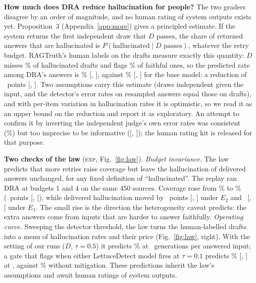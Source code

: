 \textbf{How much does DRA reduce hallucination for people?} The two graders disagree by an order of
magnitude, and no human rating of system outputs exists yet. Proposition~3 (Appendix~\ref{app:more}) gives a
principled estimate. If the system returns the first independent draw that $D$ passes, the share
of returned answers that are hallucinated is $P(\text{hallucinated}\mid D\text{ passes})$, whatever
the retry budget. RAGTruth's human labels on the drafts measure exactly this quantity: $D$ misses
\lawBeta\% of hallucinated drafts and flags \lawAlpha\% of faithful ones, so the predicted rate among
DRA's answers is \lawPi\% [\lawPiLo, \lawPiHi], against \lawH\% [\lawHLo, \lawHHi] for the base model:
a reduction of \lawRed\ points [\lawRedLo, \lawRedHi]. Two assumptions carry this estimate (draws
independent given the input, and the detector's error rates on resampled answers equal those on
drafts), and with per-item variation in hallucination rates it is optimistic, so we read it as an
upper bound on the reduction and report it as exploratory. An attempt to confirm it by inverting the
independent judge's own error rates was consistent (\lawInv\%) but too imprecise to be informative
([\lawInvLo, \lawInvHi]); the human rating kit is released for that purpose.

\textbf{Two checks of the law} (\textsc{exp}, Fig.~\ref{fig:law}). \emph{Budget invariance.} The law
predicts that more retries raise coverage but leave the hallucination of delivered answers unchanged,
for any fixed definition of ``hallucinated''. The replay ran DRA at budgets 1 and 4 on the same 450
sources. Coverage rose from \invCovOne\% to \invCovFour\% (\invCov\ points [\invCovLo, \invCovHi]),
while delivered hallucination moved by \invETwo\ points [\invETwoLo, \invETwoHi] under $E_2$ and
\invEOne\ [\invEOneLo, \invEOneHi] under $E_1$. The small rise is the direction the heterogeneity
caveat predicts: the extra answers come from inputs that are harder to answer faithfully.
\emph{Operating curve.} Sweeping the detector threshold, the law turns the human-labelled drafts into
a menu of hallucination rates and their price (Fig.~\ref{fig:law}, right). With the setting of our
runs ($D$, $\tau=0.5$) it predicts \ocDFivePi\% at \ocDFiveDraws\ generations per answered input; a
gate that flags when either LettuceDetect model fires at $\tau=0.1$ predicts \ocUnionPi\%
[\ocUnionPiLo, \ocUnionPiHi] at \ocUnionDraws, against \lawH\% without mitigation. These predictions
inherit the law's assumptions and await human ratings of system outputs.

